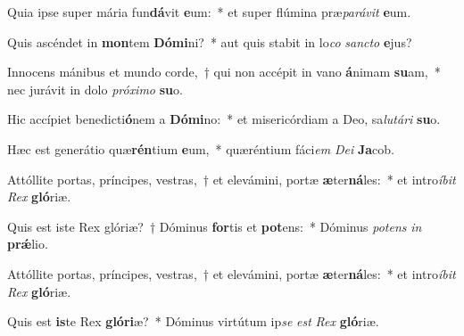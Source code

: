 \item Quia ipse super mária fun\textbf{dá}vit \textbf{e}um:~* et super flúmina præ\textit{pa}\textit{rá}\textit{vit} \textbf{e}um.
\item Quis ascéndet in \textbf{mon}tem \textbf{Dó}\textbf{mi}ni?~* aut quis stabit in lo\textit{co} \textit{sanc}\textit{to} \textbf{e}jus?
\item Innocens mánibus et mundo corde,~† qui non accépit in vano \textbf{á}nimam \textbf{su}am,~* nec jurávit in dolo \textit{pró}\textit{xi}\textit{mo} \textbf{su}o.
\item Hic accípiet benedicti\textbf{ó}nem a \textbf{Dó}\textbf{mi}no:~* et misericórdiam a Deo, sa\textit{lu}\textit{tá}\textit{ri} \textbf{su}o.
\item Hæc est generátio quæ\textbf{rén}tium \textbf{e}um,~* quæréntium fáci\textit{em} \textit{De}\textit{i} \textbf{Ja}cob.
\item Attóllite portas, príncipes, vestras,~† et elevámini, portæ \textbf{æ}ter\textbf{ná}les:~* et intro\textit{í}\textit{bit} \textit{Rex} \textbf{gló}riæ.
\item Quis est iste Rex glóriæ?~† Dóminus \textbf{for}tis et \textbf{pot}ens:~* Dóminus \textit{pot}\textit{ens} \textit{in} \textbf{prǽ}lio.
\item Attóllite portas, príncipes, vestras,~† et elevámini, portæ \textbf{æ}ter\textbf{ná}les:~* et intro\textit{í}\textit{bit} \textit{Rex} \textbf{gló}riæ.
\item Quis est \textbf{is}te Rex \textbf{gló}\textbf{ri}æ?~* Dóminus virtútum ip\textit{se} \textit{est} \textit{Rex} \textbf{gló}riæ.

